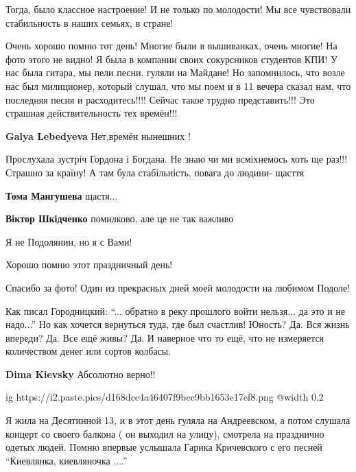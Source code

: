 \begin{itemize}

Тогда, было классное настроение! И не только по молодости! Мы все чувствовали
стабильность в наших семьях, в стране!


Очень хорошо помню тот день! Многие были в вышиванках, очень многие! На фото
этого не видно! Я была в компании своих сокурсников студентов КПИ! У нас была
гитара, мы пели песни, гуляли на Майдане! Но запомнилось, что возле нас был
милиционер, который слушал, что мы поем и в 11 вечера сказал нам, что последняя
песня и расходитесь!!!! Сейчас такое трудно представить!!! Это страшная
действительность тех времён!!!

\textbf{Galya Lebedyeva} Нет,времён нынешних !


Прослухала зустріч Гордона і Богдана. Не знаю чи ми всміхнемось хоть ще раз!!!
Страшно за країну! А там була стабільність, повага до людини- щасття

\begin{itemize} %
\textbf{Тома Мангушева} щастя...

\textbf{Віктор Шкідченко} помилково, але це не так важливо
\end{itemize} %

Я не Подолянин, но я с Вами!

Хорошо помню этот праздничный день!

Спасибо за фото! Один из прекрасных дней моей молодости на любимом Подоле!


Как писал Городницкий: \enquote{... обратно в реку прошлого войти нельзя... да это и не
надо...} Но как хочется вернуться туда, где был счастлив! Юность? Да. Вся жизнь
впереди? Да. Все ещё живы? Да. И наверное что то ещё, что не измеряется
количеством денег или сортов колбасы.

\textbf{Dima Kievsky} Абсолютно верно!!


\ifcmt
  ig https://i2.paste.pics/d168dcc4a46407f9bcc9bb1653e17ef8.png
  @width 0.2
\fi


Я жила на Десятинной 13, и в этот день гуляла на Андреевском, а потом слушала
концерт со своего балкона ( он выходил на улицу), смотрела на празднично одетых
людей. Помню впервые услышала Гарика Кричевского с его песней \enquote{Киевлянка,
киевляночка ....}



\end{itemize}

